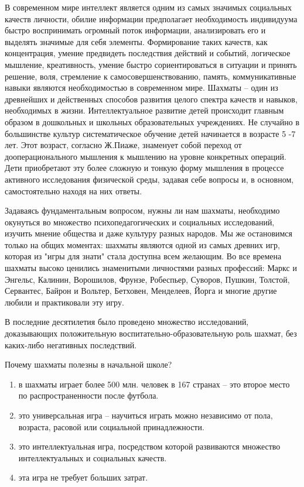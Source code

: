 В современном мире интеллект является одним из самых значимых социальных качеств личности, обилие информации предполагает необходимость индивидуума быстро воспринимать огромный поток информации, анализировать его и выделять значимые для себя элементы. Формирование таких качеств, как концентрация, умение предвидеть последствия действий и событий, логическое мышление, креативность, умение быстро сориентироваться в ситуации и принять решение, воля, стремление к самосовершенствованию, память, коммуникативные навыки являются необходимостью в современном мире. Шахматы – один из древнейших и действенных способов развития целого спектра качеств и навыков, необходимых в жизни.
Интеллектуальное развитие детей происходит главным образом в дошкольных и школьных образовательных учреждениях. Не случайно в большинстве культур систематическое обучение детей начинается в возрасте 5 -7 лет. Этот возраст, согласно Ж.Пиаже, знаменует собой переход от дооперационального мышления к мышлению на уровне конкретных операций. Дети приобретают эту более сложную и тонкую форму мышления в процессе активного исследования физической среды, задавая себе вопросы и, в основном, самостоятельно находя на них ответы.

Задаваясь фундаментальным вопросом, нужны ли нам шахматы, необходимо окунуться во множество психопедагогических и социальных исследований, изучить мнение общества и даже культуру разных народов. Мы же остановимся только на общих моментах: шахматы являются одной из самых древних игр, которая из "игры для знати" стала доступна всем желающим. Во все времена шахматы высоко ценились знаменитыми личностями разных профессий: Маркс и Энгельс, Калинин, Ворошилов, Фрунзе, Робеспьер, Суворов, Пушкин, Толстой, Сервантес, Байрон и Вольтер, Бетховен, Менделеев, Йорга и многие другие любили и практиковали эту игру.

В последние десятилетия было проведено множество исследований, доказывающих положительную воспитательно-образовательную роль шахмат, без каких-либо негативных последствий.

Почему шахматы полезны в начальной школе?
\begin{enumerate}
\item в шахматы играет более 500 млн. человек в 167 странах – это второе место по распространенности после футбола.
\item это универсальная игра – научиться играть можно независимо от пола, возраста, расовой или социальной принадлежности.
\item это интеллектуальная игра, посредством которой развиваются множество интеллектуальных и социальных качеств.
\item эта игра не требует больших затрат.
\end{enumerate}

